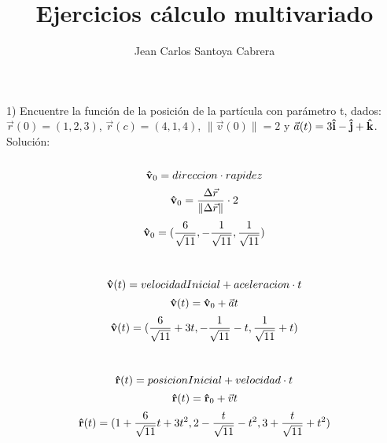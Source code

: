 \documentclass{article}
\author{Jean Carlos Santoya Cabrera}
\DeclareRobustCommand{\uvec}[1]{{%
  \ifcsname uvec#1\endcsname
     \csname uvec#1\endcsname
   \else
    \bm{\hat{\mathbf{#1}}}%
   \fi
}}
\newcommand{\tab}[1][1cm]{\hspace*{#1}}
\begin{document}
    \title{Ejercicios cálculo multivariado}
    \maketitle
    \begin{flushleft}
        1) Encuentre la función de la posición de la partícula con parámetro t, dados: $\vec{r}(0) = (1, 2, 3)$, $\vec{r}(c) = (4, 1, 4)$,
         $\|\vec{v}(0)\| = 2$ y $\vec{a}(t) = 3\uvec{i} -\uvec{j} + \uvec{k}$.\\
        \tab[3.2mm] Solución:\\
        \\
        \begin{equation}
            \uvec{v}_0 = direccion \cdot rapidez
        \end{equation}
        \begin{equation}
            \uvec{v}_0 = \frac{ \Delta \vec{r} }{ \|\Delta \vec{r}\| } \cdot 2
        \end{equation}
        \begin{equation}
            \uvec{v}_0 = (\frac{6}{\sqrt{11}}, -\frac{1}{\sqrt{11}}, \frac{1}{\sqrt{11}})
        \end{equation}

        \\
        \begin{equation}
            \uvec{v}(t) = velocidadInicial + aceleracion \cdot t
        \end{equation}
        \begin{equation}
            \uvec{v}(t) = \uvec{v}_0 + \vec{a} t
        \end{equation}
        \begin{equation}
            \uvec{v}(t) = (\frac{6}{\sqrt{11}} + 3t, -\frac{1}{\sqrt{11}} - t, \frac{1}{\sqrt{11}} + t)
        \end{equation}

        \\
        \begin{equation}
            \uvec{r}(t) = posicionInicial + velocidad \cdot t
        \end{equation}
        \begin{equation}
            \uvec{r}(t) = \uvec{r}_0 + \vec{v} t
        \end{equation}
        \begin{equation}
            \uvec{r}(t) = (1 + \frac{6}{\sqrt{11}}t + 3t^2, 2 - \frac{t}{\sqrt{11}} - t^2, 3 + \frac{t}{\sqrt{11}} + t^2)
        \end{equation}
    \end{flushleft}
    
\end{document}
